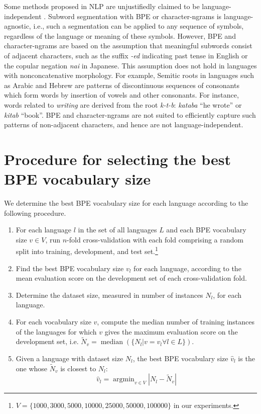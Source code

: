 \documentclass[11pt,a4paper]{article}
\DeclareMathOperator{\median}{median}
\DeclareMathOperator*{\argmin}{argmin}
\begin{document}
Some methods proposed in NLP are unjustifiedly claimed to be language-independent \citep{bender2011independence}.
Subword segmentation with BPE or character-ngrams is language-agnostic, i.e., such a segmentation can be applied to any sequence of symbols, regardless of the language or meaning of these symbols.
However, BPE and character-ngrams are based on the assumption that meaningful subwords consist of adjacent characters, such as the suffix \emph{-ed} indicating past tense in English or the copular negation \emph{nai} in Japanese.
This assumption does not hold in languages with nonconcatenative morphology.
For example, Semitic roots in languages such as Arabic and Hebrew are patterns of discontinuous sequences of consonants which form words by insertion of vowels and other consonants. 
For instance, words related to \emph{writing} are derived from the root \emph{k-t-b}: \emph{kataba} ``he wrote'' or \emph{kitab} ``book''.
BPE and character-ngrams are not suited to efficiently capture such patterns of non-adjacent characters, and hence are not language-independent.

\section{Procedure for selecting the best BPE vocabulary size}
\label{sec:best-vocab-size}

We determine the best BPE vocabulary size for each language according to the following procedure.
\begin{enumerate}
	\item For each language $l$ in the set of all languages $L$ and each BPE vocabulary size $v \in V$, run $n$-fold cross-validation with each fold comprising a random split into training, development, and test set.\footnote{$V = \{1000, 3000, 5000, 10000, 25000, 50000, 100000\}$ in our experiments.}
	\item Find the best BPE vocabulary size $v_l$ for each language, according to the mean evaluation score on the development set of each cross-validation fold.
	\item Determine the dataset size, measured in number of instances $N_l$, for each language.
	\item For each vocabulary size $v$, compute the median number of training instances of the languages for which $v$ gives the maximum evaluation score on the development set, i.e. $\widetilde{N}_v = \median(\{N_l | v = v_l \forall l \in L\})$.
	\item Given a language with dataset size $N_l$, the best BPE vocabulary size $\hat{v}_l$ is the one whose $\widetilde{N}_v$ is closest to $N_l$: $$\hat{v}_l = \argmin_{v \in V} \left| N_l - \widetilde{N}_v \right|$$
\end{enumerate}
\end{document}
